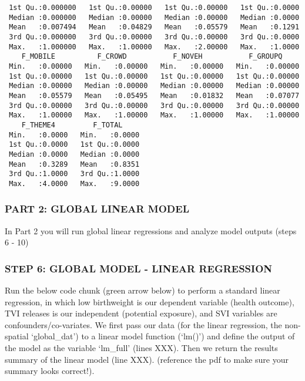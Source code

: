 \documentclass[
  12pt,
]{article}
\begin{document}
\begin{verbatim}
 1st Qu.:0.000000   1st Qu.:0.00000   1st Qu.:0.00000   1st Qu.:0.0000  
 Median :0.000000   Median :0.00000   Median :0.00000   Median :0.0000  
 Mean   :0.007494   Mean   :0.04829   Mean   :0.05579   Mean   :0.1291  
 3rd Qu.:0.000000   3rd Qu.:0.00000   3rd Qu.:0.00000   3rd Qu.:0.0000  
 Max.   :1.000000   Max.   :1.00000   Max.   :2.00000   Max.   :1.0000  
    F_MOBILE          F_CROWD           F_NOVEH           F_GROUPQ      
 Min.   :0.00000   Min.   :0.00000   Min.   :0.00000   Min.   :0.00000  
 1st Qu.:0.00000   1st Qu.:0.00000   1st Qu.:0.00000   1st Qu.:0.00000  
 Median :0.00000   Median :0.00000   Median :0.00000   Median :0.00000  
 Mean   :0.05579   Mean   :0.05495   Mean   :0.01832   Mean   :0.07077  
 3rd Qu.:0.00000   3rd Qu.:0.00000   3rd Qu.:0.00000   3rd Qu.:0.00000  
 Max.   :1.00000   Max.   :1.00000   Max.   :1.00000   Max.   :1.00000  
    F_THEME4         F_TOTAL      
 Min.   :0.0000   Min.   :0.0000  
 1st Qu.:0.0000   1st Qu.:0.0000  
 Median :0.0000   Median :0.0000  
 Mean   :0.3289   Mean   :0.8351  
 3rd Qu.:1.0000   3rd Qu.:1.0000  
 Max.   :4.0000   Max.   :9.0000  
\end{verbatim}

\hypertarget{part-2-global-linear-model}{%
\subsubsection{PART 2: GLOBAL LINEAR
MODEL}\label{part-2-global-linear-model}}

In Part 2 you will run global linear regressions and analyze model
outputs (steps 6 - 10)

\hypertarget{step-6-global-model---linear-regression}{%
\subsubsection{STEP 6: GLOBAL MODEL - LINEAR
REGRESSION}\label{step-6-global-model---linear-regression}}

Run the below code chunk (green arrow below) to perform a standard
linear regression, in which low birthweight is our dependent variable
(health outcome), TVI releases is our independent (potential exposure),
and SVI variables are confounders/co-variates. We first pass our data
(for the linear regression, the non-spatial `global\_dat') to a linear
model function (`lm()') and define the output of the model as the
variable `lm\_full' (lines XXX). Then we return the results summary of
the linear model (line XXX). (reference the pdf to make sure your
summary looks correct!).
\end{document}
